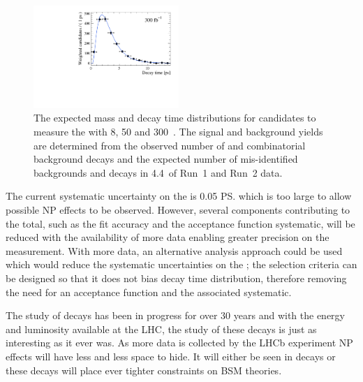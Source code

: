 \begin{figure}[tbp]
        \includegraphics[width=0.49\textwidth]{./Figs/Summary/300fb_time.pdf}
    \caption{The expected mass and decay time distributions for \bsmumu candidates to measure the \el with 8, 50 and 300~\fb. The signal and background yields are determined from the observed number of \bsmumu and combinatorial background decays and the expected number of mis-identified backgrounds and \bdmumu decays in 4.4~\fb of Run~1 and Run~2 data.}
    \label{fig:expected_dist}
\end{figure}





The current systematic uncertainty on the \el is 0.05 \ps which is too large to allow possible NP effects to be observed. However, several components contributing to the total, such as the fit accuracy and the acceptance function systematic, will be reduced with the availability of more data enabling greater precision on the measurement. With more data, an alternative analysis approach could be used which would reduce the systematic uncertainties on the \el; the selection criteria can be designed so that it does not bias \bsmumu decay time distribution, therefore removing the need for an acceptance function and the associated systematic.


The study of \bmumu decays has been in progress for over 30 years and with the energy and luminosity available at the LHC, the study of these decays is just as interesting as it ever was. As more data is collected by the LHCb experiment NP effects will have less and less space to hide. It will either be seen in \bmumu decays or these decays will place ever tighter constraints on BSM theories. 
